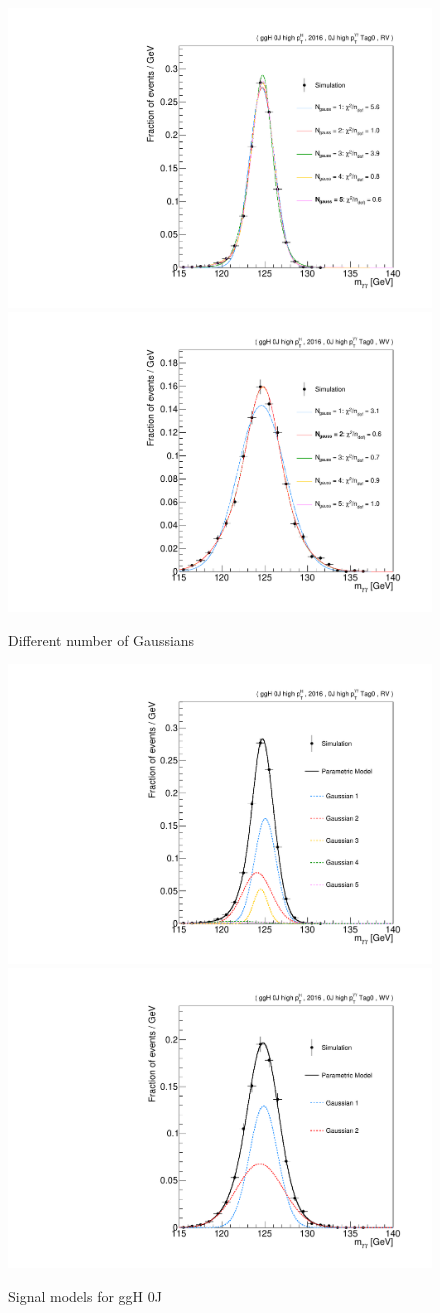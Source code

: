 \begin{figure}[hptb]
  \centering
  \includegraphics[width=.49\textwidth]{Figures/hgg_stats/fTest_RECO_0J_PTH_GT10_Tag0_GG2H_0J_PTH_GT10_RV.pdf}
  \hfill
  \includegraphics[width=.49\textwidth]{Figures/hgg_stats/fTest_RECO_0J_PTH_GT10_Tag0_GG2H_0J_PTH_GT10_WV.pdf}
  \caption[Signal modelling: number of Gaussians]
  {
    Different number of Gaussians
  }
  \label{fig:sigmodels_ftest}
\end{figure}

\begin{figure}
  \centering
  \includegraphics[width=.49\textwidth]{Figures/hgg_stats/RV_shape_pdf_components_GG2H_0J_PTH_GT10_RECO_0J_PTH_GT10_Tag0.pdf}
  \hfill
  \includegraphics[width=.49\textwidth]{Figures/hgg_stats/WV_shape_pdf_components_GG2H_0J_PTH_GT10_RECO_0J_PTH_GT10_Tag0.pdf}
  \caption[Signal modelling: components]
  {
    Signal models for ggH 0J \pTH
  }
  \label{fig:signal_fitting}
\end{figure}

